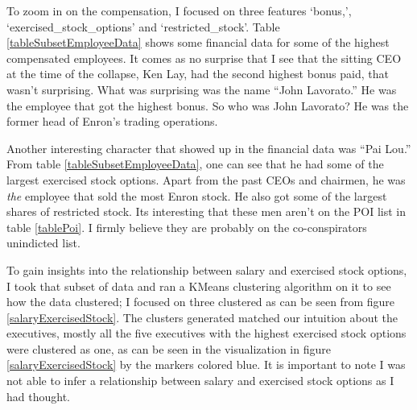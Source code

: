 \documentclass[titlepage,numbers=noenddot,headinclude,%
               footinclude=true,abstractoff,BCOR=5mm,%
               paper=a4,fontsize=11pt,ngerman,american]{scrreprt}
\numberwithin{theorem}{chapter}
\numberwithin{definition}{chapter}
\numberwithin{algorithm}{chapter}
\numberwithin{figure}{chapter}
\numberwithin{table}{chapter}
\numberwithin{equation}{chapter}
\begin{document}
To zoom in on the compensation, I focused on three features `bonus,', `exercised\_stock\_options' and `restricted\_stock'. Table \ref{tableSubsetEmployeeData} shows some financial data for some of the highest compensated employees. It comes as no surprise that I see that the sitting CEO at the time of the collapse, Ken Lay, had the second highest bonus paid, that wasn't surprising. What was surprising was the name ``John Lavorato.'' He was the employee that got the highest bonus. So who was John Lavorato? He was the former head of Enron's trading operations.

Another interesting character that showed up in the financial data was ``Pai Lou.'' From table \ref{tableSubsetEmployeeData}, one can see that he had some of the largest exercised stock options. Apart from the past CEOs and chairmen, he was \emph{the} employee that sold the most Enron stock. He also got some of the largest shares of restricted stock. Its interesting that these men aren't on the POI list in table \ref{tablePoi}. I firmly believe they are probably on the co-conspirators unindicted list.

To gain insights into the relationship between salary and exercised stock options, I took that subset of data and ran a KMeans clustering algorithm on it to see how the data clustered; I focused on three clustered as can be seen from figure \ref{salaryExercisedStock}. The clusters generated matched our intuition about the executives, mostly all the five executives with the highest exercised stock options were clustered as one, as can be seen in the visualization in figure \ref{salaryExercisedStock} by the markers colored blue. It is important to note I was not able to infer a relationship between salary and exercised stock options as I had thought.
\end{document}
